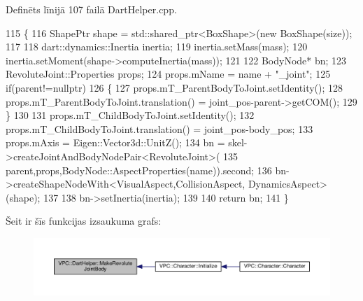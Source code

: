 Definēts līnijā 107 failā Dart\+Helper.\+cpp.


\begin{DoxyCode}
115 \{
116     ShapePtr shape = std::shared\_ptr<BoxShape>(\textcolor{keyword}{new} BoxShape(size));
117 
118     dart::dynamics::Inertia inertia;
119     inertia.setMass(mass);
120     inertia.setMoment(shape->computeInertia(mass));
121 
122     BodyNode* bn;
123     RevoluteJoint::Properties props;
124     props.mName = name + \textcolor{stringliteral}{"\_joint"};
125     \textcolor{keywordflow}{if}(parent!=\textcolor{keyword}{nullptr})
126     \{
127         props.mT\_ParentBodyToJoint.setIdentity();
128         props.mT\_ParentBodyToJoint.translation() = joint\_pos-parent->getCOM();
129     \}
130 
131     props.mT\_ChildBodyToJoint.setIdentity();
132     props.mT\_ChildBodyToJoint.translation() = joint\_pos-body\_pos;
133     props.mAxis = Eigen::Vector3d::UnitZ();
134     bn = skel->createJointAndBodyNodePair<RevoluteJoint>(
135         parent,props,BodyNode::AspectProperties(name)).second;
136     bn->createShapeNodeWith<VisualAspect,CollisionAspect, DynamicsAspect>(shape);
137     
138     bn->setInertia(inertia);
139 
140     \textcolor{keywordflow}{return} bn;
141 \}
\end{DoxyCode}


Šeit ir šīs funkcijas izsaukuma grafs\+:
\nopagebreak
\begin{figure}[H]
\begin{center}
\leavevmode
\includegraphics[width=350pt]{namespace_v_p_c_1_1_dart_helper_a4cf2225ca4d44189f0f0f390cf7aff99_icgraph}
\end{center}
\end{figure}



